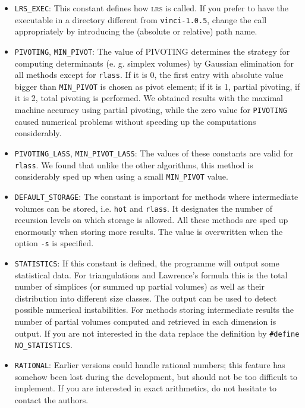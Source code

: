 \documentclass [12pt]{article}
\begin{document}
\begin {itemize}
\item \texttt {LRS\_EXEC}:
   This constant defines how \textsc {lrs} is called. If you
   prefer to have the executable in a directory different from
   \texttt {vinci-1.0.5}, change the call appropriately by introducing the
   (absolute or relative) path name.
\item \texttt {PIVOTING}, \texttt {MIN\_PIVOT}:
   The value of PIVOTING determines the strategy for computing determinants
   (e. g. simplex volumes) by Gaussian elimination for all methods except for
   \texttt {rlass}. If it is 0, the first entry with absolute value bigger than    \texttt {MIN\_PIVOT} is chosen as pivot element;
   if it is 1, partial pivoting, if it is 2, total pivoting is performed.
   We obtained results with the maximal machine accuracy using partial
   pivoting, while the zero value for \texttt {PIVOTING} caused numerical          problems without speeding up the computations considerably.
\item \texttt {PIVOTING\_LASS}, \texttt {MIN\_PIVOT\_LASS}:
   The values of these constants are valid for \texttt {rlass}. We found that       unlike the other algorithms, this method is considerably sped up when using a     small \texttt {MIN\_PIVOT} value.
\item \texttt {DEFAULT\_STORAGE}:
   The constant is important for methods where intermediate volumes can be
   stored, i.e. \texttt {hot} and \texttt {rlass}. It
   designates the number of recursion levels on which storage is allowed.
   All these methods are sped up enormously when storing more results. The value     is overwritten when the option \texttt {-s} is specified.
\item \texttt {STATISTICS}:
   If this constant is defined, the programme will output some statistical data.
   For triangulations and Lawrence's formula this is the total number of
   simplices (or summed up partial volumes) as well as their distribution into
   different size classes. The output can be used to detect possible numerical
   instabilities. For methods storing intermediate results the number of
   partial volumes computed and retrieved in each dimension is output.
   If you are not interested in the data replace the definition
   by \texttt {\#define NO\_STATISTICS}.
\item \texttt {RATIONAL}:
   Earlier versions could handle rational numbers; this feature has somehow been
   lost during the development, but should not be too difficult to implement.
   If you are interested in exact arithmetics, do not hesitate to contact the
   authors.
\end {itemize}
\end{document}
